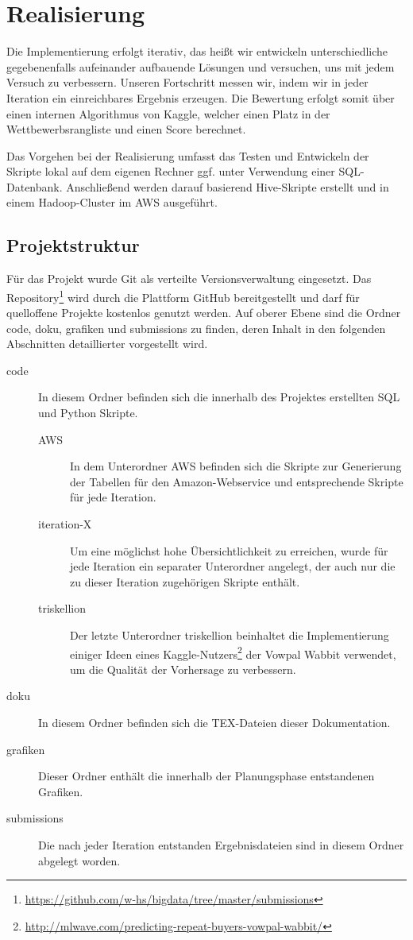 \section{Realisierung}

Die Implementierung erfolgt iterativ, das heißt wir entwickeln unterschiedliche gegebenenfalls aufeinander aufbauende Lösungen
und versuchen, uns mit jedem Versuch zu verbessern. Unseren Fortschritt messen wir, indem wir in jeder Iteration ein einreichbares Ergebnis erzeugen. Die Bewertung erfolgt somit über einen internen Algorithmus von Kaggle, welcher einen Platz in der Wettbewerbsrangliste und einen Score berechnet.

Das Vorgehen bei der Realisierung umfasst das Testen und Entwickeln der Skripte lokal auf 
dem eigenen Rechner ggf. unter Verwendung einer SQL-Datenbank. 
Anschließend werden darauf basierend Hive-Skripte erstellt und in einem Hadoop-Cluster
im AWS ausgeführt.

\subsection{Projektstruktur}
Für das Projekt wurde Git als verteilte Versionsverwaltung eingesetzt. Das Repository\footnote{\url{https://github.com/w-hs/bigdata/tree/master/submissions}} wird durch die Plattform GitHub bereitgestellt und darf für quelloffene Projekte kostenlos genutzt werden. Auf oberer Ebene sind die Ordner code, doku, grafiken und submissions zu finden, deren Inhalt in den folgenden Abschnitten detaillierter vorgestellt wird.

\begin{description}
	\item[code] In diesem Ordner befinden sich die innerhalb des Projektes erstellten SQL und Python Skripte.
		\begin{description}
			\item[AWS] In dem Unterordner AWS befinden sich die Skripte zur Generierung der Tabellen für den Amazon-Webservice und entsprechende Skripte für jede Iteration.
			\item[iteration-X] Um eine möglichst hohe Übersichtlichkeit zu erreichen, wurde für jede Iteration ein separater Unterordner angelegt, der auch nur die zu dieser Iteration zugehörigen Skripte enthält.
			\item[triskellion] Der letzte Unterordner triskellion beinhaltet die Implementierung einiger Ideen eines Kaggle-Nutzers\footnote{\url{http://mlwave.com/predicting-repeat-buyers-vowpal-wabbit/}} der Vowpal Wabbit verwendet, um die Qualität der Vorhersage zu verbessern.
		\end{description}
	\item[doku] In diesem Ordner befinden sich die TEX-Dateien dieser Dokumentation.
	\item[grafiken] Dieser Ordner enthält die innerhalb der Planungsphase entstandenen Grafiken.
	\item[submissions] Die nach jeder Iteration entstanden Ergebnisdateien sind in diesem Ordner abgelegt worden.
\end{description}

